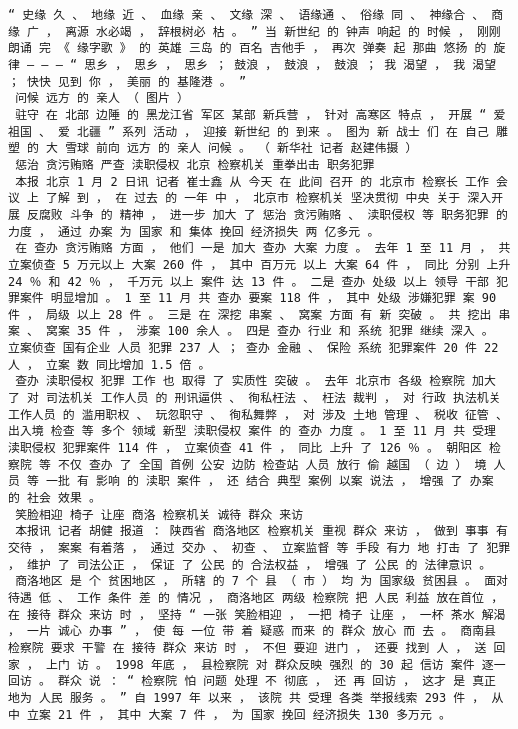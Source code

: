 \documentclass{article}
\begin{document}
\begin{Verbatim}[commandchars=\\\{\}]
 “ 史缘 久 、 地缘 近 、 血缘 亲 、 文缘 深 、 语缘通 、 俗缘 同 、 神缘合 、 商缘 广 ， 离源 水必竭 ， 辞根树必 枯 。 ” 当 新世纪 的 钟声 响起 的 时候 ， 刚刚 朗诵 完 《 缘字歌 》 的 英雄 三岛 的 百名 吉他手 ， 再次 弹奏 起 那曲 悠扬 的 旋律 — — — “ 思乡 ， 思乡 ， 思乡 ； 鼓浪 ， 鼓浪 ， 鼓浪 ； 我 渴望 ， 我 渴望 ； 快快 见到 你 ， 美丽 的 基隆港 。 ” 
 问候 远方 的 亲人 （ 图片 ） 
 驻守 在 北部 边陲 的 黑龙江省 军区 某部 新兵营 ， 针对 高寒区 特点 ， 开展 “ 爱祖国 、 爱 北疆 ” 系列 活动 ， 迎接 新世纪 的 到来 。 图为 新 战士 们 在 自己 雕塑 的 大 雪球 前向 远方 的 亲人 问候 。 （ 新华社 记者 赵建伟摄 ） 
 惩治 贪污贿赂 严查 渎职侵权 北京 检察机关 重拳出击 职务犯罪 
 本报 北京 1 月 2 日讯 记者 崔士鑫 从 今天 在 此间 召开 的 北京市 检察长 工作 会议 上 了解 到 ， 在 过去 的 一年 中 ， 北京市 检察机关 坚决贯彻 中央 关于 深入开展 反腐败 斗争 的 精神 ， 进一步 加大 了 惩治 贪污贿赂 、 渎职侵权 等 职务犯罪 的 力度 ， 通过 办案 为 国家 和 集体 挽回 经济损失 两 亿多元 。 
 在 查办 贪污贿赂 方面 ， 他们 一是 加大 查办 大案 力度 。 去年 1 至 11 月 ， 共 立案侦查 5 万元以上 大案 260 件 ， 其中 百万元 以上 大案 64 件 ， 同比 分别 上升 24 ％ 和 42 ％ ， 千万元 以上 案件 达 13 件 。 二是 查办 处级 以上 领导 干部 犯罪案件 明显增加 。 1 至 11 月 共 查办 要案 118 件 ， 其中 处级 涉嫌犯罪 案 90 件 ， 局级 以上 28 件 。 三是 在 深挖 串案 、 窝案 方面 有 新 突破 。 共 挖出 串案 、 窝案 35 件 ， 涉案 100 余人 。 四是 查办 行业 和 系统 犯罪 继续 深入 。 立案侦查 国有企业 人员 犯罪 237 人 ； 查办 金融 、 保险 系统 犯罪案件 20 件 22 人 ， 立案 数 同比增加 1.5 倍 。 
 查办 渎职侵权 犯罪 工作 也 取得 了 实质性 突破 。 去年 北京市 各级 检察院 加大 了 对 司法机关 工作人员 的 刑讯逼供 、 徇私枉法 、 枉法 裁判 ， 对 行政 执法机关 工作人员 的 滥用职权 、 玩忽职守 、 徇私舞弊 ， 对 涉及 土地 管理 、 税收 征管 、 出入境 检查 等 多个 领域 新型 渎职侵权 案件 的 查办 力度 。 1 至 11 月 共 受理 渎职侵权 犯罪案件 114 件 ， 立案侦查 41 件 ， 同比 上升 了 126 ％ 。 朝阳区 检察院 等 不仅 查办 了 全国 首例 公安 边防 检查站 人员 放行 偷 越国 （ 边 ） 境 人员 等 一批 有 影响 的 渎职 案件 ， 还 结合 典型 案例 以案 说法 ， 增强 了 办案 的 社会 效果 。 
 笑脸相迎 椅子 让座 商洛 检察机关 诚待 群众 来访 
 本报讯 记者 胡健 报道 ： 陕西省 商洛地区 检察机关 重视 群众 来访 ， 做到 事事 有 交待 ， 案案 有着落 ， 通过 交办 、 初查 、 立案监督 等 手段 有力 地 打击 了 犯罪 ， 维护 了 司法公正 ， 保证 了 公民 的 合法权益 ， 增强 了 公民 的 法律意识 。 
 商洛地区 是 个 贫困地区 ， 所辖 的 7 个 县 （ 市 ） 均 为 国家级 贫困县 。 面对 待遇 低 、 工作 条件 差 的 情况 ， 商洛地区 两级 检察院 把 人民 利益 放在首位 ， 在 接待 群众 来访 时 ， 坚持 “ 一张 笑脸相迎 ， 一把 椅子 让座 ， 一杯 茶水 解渴 ， 一片 诚心 办事 ” ， 使 每 一位 带 着 疑惑 而来 的 群众 放心 而 去 。 商南县 检察院 要求 干警 在 接待 群众 来访 时 ， 不但 要迎 进门 ， 还要 找到 人 ， 送 回家 ， 上门 访 。 1998 年底 ， 县检察院 对 群众反映 强烈 的 30 起 信访 案件 逐一 回访 。 群众 说 ： “ 检察院 怕 问题 处理 不 彻底 ， 还 再 回访 ， 这才 是 真正 地为 人民 服务 。 ” 自 1997 年 以来 ， 该院 共 受理 各类 举报线索 293 件 ， 从中 立案 21 件 ， 其中 大案 7 件 ， 为 国家 挽回 经济损失 130 多万元 。 

\end{Verbatim}
\end{document}
